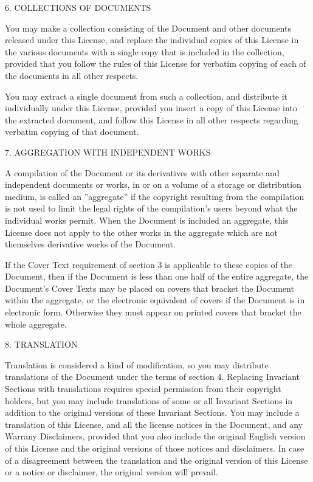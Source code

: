 6. COLLECTIONS OF DOCUMENTS

You may make a collection consisting of the Document and other documents released under this License, and replace the
individual copies of this License in the various documents with a single copy that is included in the collection,
provided that you follow the rules of this License for verbatim copying of each of the documents in all other respects.

You may extract a single document from such a collection, and distribute it individually under this License, provided
you insert a copy of this License into the extracted document, and follow this License in all other respects regarding
verbatim copying of that document.

7. AGGREGATION WITH INDEPENDENT WORKS

A compilation of the Document or its derivatives with other separate and independent documents or works, in or on a
volume of a storage or distribution medium, is called an ''aggregate'' if the copyright resulting from the compilation
is not used to limit the legal rights of the compilation's users beyond what the individual works permit. When the
Document is included an aggregate, this License does not apply to the other works in the aggregate which are not
themselves derivative works of the Document.

If the Cover Text requirement of section 3 is applicable to these copies of the Document, then if the Document is less
than one half of the entire aggregate, the Document's Cover Texts may be placed on covers that bracket the Document
within the aggregate, or the electronic equivalent of covers if the Document is in electronic form. Otherwise they must
appear on printed covers that bracket the whole aggregate.

8. TRANSLATION

Translation is considered a kind of modification, so you may distribute translations of the Document under the terms of
section 4. Replacing Invariant Sections with translations requires special permission from their copyright holders, but
you may include translations of some or all Invariant Sections in addition to the original versions of these Invariant
Sections. You may include a translation of this License, and all the license notices in the Document, and any Warrany
Disclaimers, provided that you also include the original English version of this License and the original versions of
those notices and disclaimers. In case of a disagreement between the translation and the original version of this
License or a notice or disclaimer, the original version will prevail.

